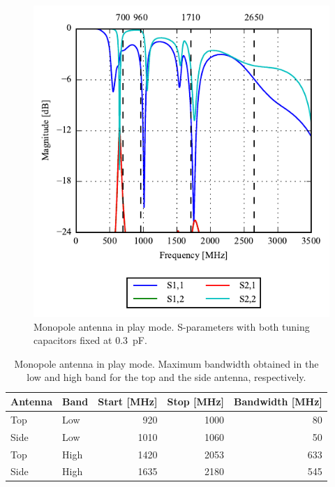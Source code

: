 \begin{figure}[htbp]
    \centering
    \includegraphics{img/tech_sol/monopole/play_mode/sparams_play.pdf}
    \caption{Monopole antenna in play mode. S-parameters with both tuning capacitors fixed at \SI{0.3}{pF}.}
    \label{fig:triang_sparam_data}
\end{figure}

\begin{table}[htbp]
    \centering
    \begin{tabular}{|l|l|r|r|r|}
      \hline
      Antenna & Band & Start [MHz] & Stop [MHz] & Bandwidth [MHz] \\
      \hline
      Top     & Low  & 920 & 1000 &  80 \\
      Side    & Low  & 1010 & 1060 & 50 \\
      \hline
      Top     & High & 1420 & 2053 & 633 \\
      Side    & High & 1635 & 2180 & 545 \\
      \hline
    \end{tabular}
    \caption{Monopole antenna in play mode. Maximum bandwidth obtained in the low and high band for the top and the side antenna, respectively.}    \label{tab:bw_sol1play}
  \end{table}

